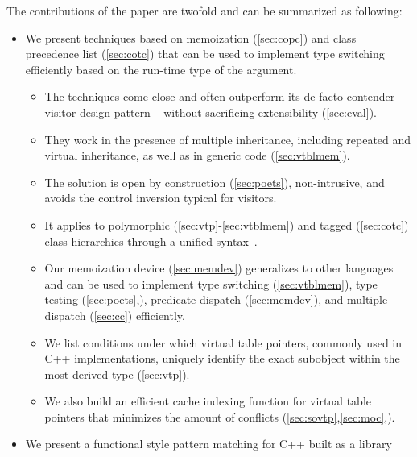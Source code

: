 \documentclass[preprint]{sigplanconf}
\begin{document}
The contributions of the paper are twofold and can be summarized as following:

\begin{itemize}
\setlength{\itemsep}{0pt}
\setlength{\parskip}{0pt}
\item We present techniques based on memoization (\textsection\ref{sec:copc}) and 
class precedence list (\textsection\ref{sec:cotc}) that can be used to implement 
type switching efficiently based on the run-time type of the argument.

  \begin{itemize}
  \setlength{\itemsep}{0pt}
  \setlength{\parskip}{0pt}
  \item The techniques come close and often outperform its de facto contender -- 
        visitor design pattern -- without sacrificing extensibility (\textsection\ref{sec:eval}).
  \item They work in the presence of multiple inheritance, including repeated and 
        virtual inheritance, as well as in generic code (\textsection\ref{sec:vtblmem}).
  \item The solution is open by construction (\textsection\ref{sec:poets}), 
        non-intrusive, and avoids the control inversion typical for visitors.
  \item It applies to polymorphic (\textsection\ref{sec:vtp}-\ref{sec:vtblmem}) and 
        tagged (\textsection\ref{sec:cotc}) class hierarchies through a unified  
        syntax~\cite{AP}.
  \item Our memoization device (\textsection\ref{sec:memdev}) generalizes to 
        other languages and can be used to implement type switching 
        (\textsection\ref{sec:vtblmem}), type testing 
        (\textsection\ref{sec:poets},\cite[]{TR}), predicate dispatch 
        (\textsection\ref{sec:memdev}), and multiple dispatch 
        (\textsection\ref{sec:cc}) efficiently.
  \item We list conditions under which virtual table pointers, commonly used in 
        C++ implementations, uniquely identify the exact subobject within the 
        most derived type (\textsection\ref{sec:vtp}).
  \item We also build an efficient cache indexing function for virtual table 
        pointers that minimizes the amount of conflicts 
        (\textsection\ref{sec:sovtp},\ref{sec:moc},\cite[.5]{TR}).
  \end{itemize}
\item We present a functional style pattern matching for C++ built as a library 

\end{itemize}
\end{document}
